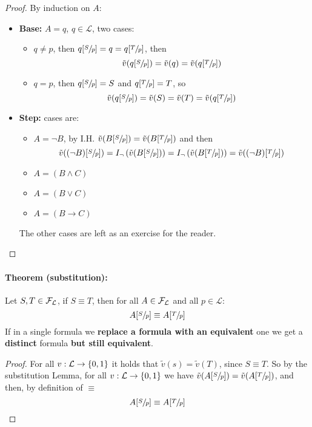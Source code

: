 \documentclass[11pt]{article}
\begin{document}
	\begin{proof}
		By induction on $A$: 
		\begin{itemize}
			\item \textbf{Base:} $A = q$, $q \in \mathcal{L}$, two cases: 
			\begin{itemize}
				\item $q \neq p$, then $q [\sfrac{S}{p}] = q = q [\sfrac{T}{p}]$, then 
				$$\tilde{v}(q[\sfrac{S}{p}]) = \tilde{v}(q) = \tilde{v} (q[\sfrac{T}{p}])$$
				
				\item $q = p$, then $q[\sfrac{S}{p}] = S$ and $q[\sfrac{T}{p}] = T$, so
				$$ \tilde{v} (q [\sfrac{S}{p}]) = \tilde{v} (S) = \tilde{v} (T) = \tilde{v} (q[\sfrac{T}{p}]) $$
			\end{itemize}
			
			\item \textbf{Step:} cases are: 
			\begin{itemize}
				\item $A = \neg B$, by I.H. $\tilde{v} (B [\sfrac{S}{p}]) = \tilde{v} (B [\sfrac{T}{p}])$ and then 
				$$ \tilde{v} ((\neg B) [\sfrac{S}{p}])  = I_\neg \left(\tilde{v} (B [\sfrac{S}{p}])\right) = I_\neg \left(\tilde{v} (B [\sfrac{T}{p}])\right) = \tilde{v} ((\neg B) [\sfrac{T}{p}])$$
				\item $A = (B \wedge C)$
				\item $A = (B \vee C)$
				\item $A = (B \rightarrow C)$
			\end{itemize}
			The other cases are left as an exercise for the reader.\\
		\end{itemize}
	\end{proof}
	
	\paragraph{Theorem (substitution):} Let $S, T \in \mathcal{F}_\mathcal{L}$, if $S \equiv T$, then for all $A \in \mathcal{F}_\mathcal{L}$ and all $p \in \mathcal{L}$:
	$$ A[\sfrac{S}{p}] \equiv A[\sfrac{T}{p}] $$
	If in a single formula we \textbf{replace a formula with an equivalent} one we get a \textbf{distinct} formula \textbf{but still equivalent}.\\
	
	\begin{proof}
		For all $v: \mathcal{L} \rightarrow \{0,1\}$ it holds that $\tilde{v} (s) = \tilde{v} (T)$, since $S \equiv T$. So by the substitution Lemma, for all $v: \mathcal{L} \rightarrow \{0,1\}$ we have $\tilde{v} (A [\sfrac{S}{p}]) = \tilde{v} (A[\sfrac{T}{p}])$, and then, by definition of $\equiv$
		$$ A[\sfrac{S}{p}] \equiv A[\sfrac{T}{p}] $$
	\end{proof}
	
\end{document}
